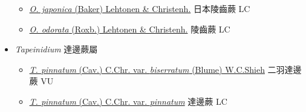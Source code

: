 \begin{itemize}
  \begin{itemize}
        \item[] \href{http://www.theplantlist.org/tpl1.1/search?q=Osmolindsaea+japonica}{\textit{O. japonica} (Baker) Lehtonen \& Christenh.}   日本陵齒蕨   LC
        \item[] \href{http://www.theplantlist.org/tpl1.1/search?q=Osmolindsaea+odorata}{\textit{O. odorata} (Roxb.) Lehtonen \& Christenh.}   陵齒蕨   LC
  \end{itemize}
 \item[    ] \textit{Tapeinidium} 達邊蕨屬
                                
  \begin{itemize}
        \item[] \href{http://www.theplantlist.org/tpl1.1/search?q=Tapeinidium+pinnatum+var.+biserratum}{\textit{T. pinnatum} (Cav.) C.Chr. var. \textit{biserratum} (Blume) W.C.Shieh}  
                                        二羽達邊蕨   VU
        \item[] \href{http://www.theplantlist.org/tpl1.1/search?q=Tapeinidium+pinnatum+var.+pinnatum}{\textit{T. pinnatum} (Cav.) C.Chr. var. \textit{pinnatum}}  
                                        達邊蕨   LC
  \end{itemize}
  \end{itemize}
